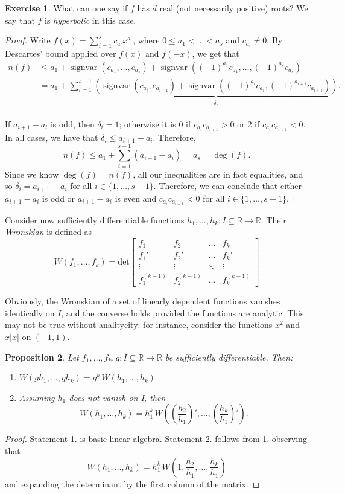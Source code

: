 \documentclass[11pt, a4paper]{article}
\newcommand{\RR}{\mathbb{R}}
\DeclareMathOperator{\sv}{signvar}
\theoremstyle{plain}
\newtheorem{prop}{Proposition}[section]
\theoremstyle{definition}
\newtheorem{ex}[prop]{Exercise}
\begin{document}
\begin{ex} What can one say if $f$ has $d$ real (not necessarily positive) roots? We say that $f$ is \emph{hyperbolic} in this case.
\end{ex}
\begin{proof} Write $f(x)=\sum_{i=1}^s c_{a_i}x^{a_i}$, where $0\leq a_1<\dots<a_s$ and $c_{a_i}\neq 0$. By Descartes' bound applied over $f(x)$ and $f(-x)$, we get that
\begin{align*}
n(f)&\leq a_1 + \sv(c_{a_1},\dots,c_{a_s}) + \sv((-1)^{a_1}c_{a_1},\dots,(-1)^{a_s}c_{a_s}) \\
&=a_1+\sum_{i=1}^{s-1}\underbrace{\left(\sv(c_{a_i},c_{a_{i+1}}) + \sv((-1)^{a_i}c_{a_i},(-1)^{a_{i+1}}c_{a_{i+1}})\right)}_{\substack{\delta_i}}.
\end{align*}

If $a_{i+1}-a_i$ is odd, then $\delta_i=1$; otherwise it is $0$ if $c_{a_i}c_{a_{i+1}}>0$ or $2$ if $c_{a_i}c_{a_{i+1}}<0$. In all cases, we have that $\delta_i\leq a_{i+1}-a_i$. Therefore,
\[n(f)\leq a_1+\sum_{i=1}^{s-1} \left(a_{i+1}-a_i\right)=a_s=\deg(f).\]
Since we know $\deg(f)=n(f)$, all our inequalities are in fact equalities, and so $\delta_i=a_{i+1}-a_i$ for all $i\in\{1,\dots, s-1\}$. Therefore, we can conclude that either $a_{i+1}-a_i$ is odd or $a_{i+1}-a_i$ is even and $c_{a_i}c_{a_{i+1}}<0$ for all $i\in\{1,\dots, s-1\}$.

\end{proof}

Consider now sufficiently differentiable functions $h_1,\dots,h_k:I\subseteq\RR\to\RR$. Their \emph{Wronskian} is defined as
\[W(f_1,\dots,f_k)=\mathrm{det}\begin{bmatrix} f_1&f_2&\dots&f_k\\f_1'&f_2'&\dots&f_k'\\ \vdots&\vdots&\ddots&\vdots\\ f_1^{(k-1)}&f_2^{(k-1)}&\dots&f_k^{(k-1)}\end{bmatrix}\]

Obviously, the Wronskian of a set of linearly dependent functions vanishes identically on $I$, and the converse holds provided the functions are analytic. This may not be true without analitycity: for instance, consider the functions $x^2$ and $x|x|$ on $(-1,1)$.

\begin{prop} Let $f_1,\dots, f_k,g:I\subseteq\RR\to\RR$ be sufficiently differentiable. Then:
\begin{enumerate}
\item $W(gh_1,\dots,gh_k)=g^k\, W(h_1,\dots, h_k)$.
\item Assuming $h_1$ does not vanish on I, then
\[W(h_1,\dots,h_k)=h_1^k \,W\left(\left(\frac{h_2}{h_1}\right)',\dots, \left(\frac{h_k}{h_1}\right)'\right).\]
\end{enumerate}
\end{prop}
\begin{proof} Statement 1. is basic linear algebra. Statement 2. follows from 1. observing that
\[W(h_1,\dots,h_k)=h_1^k \,W\left(1, \frac{h_2}{h_1},\dots, \frac{h_k}{h_1}\right)\]
and expanding the determinant by the first column of the matrix.
\end{proof}
\end{document}
